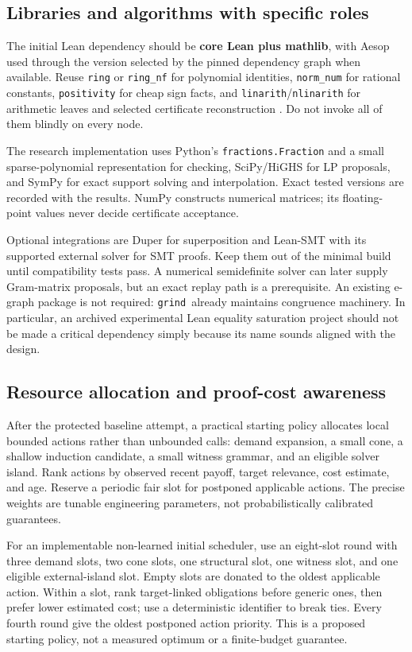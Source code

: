 \documentclass[11pt,a4paper]{article}
\newcommand{\grind}{\texttt{grind}}
\newcommand{\code}[1]{\texttt{\small #1}}
\begin{document}
\subsection{Libraries and algorithms with specific roles}

The initial Lean dependency should be \textbf{core Lean plus mathlib}, with
Aesop used through the version selected by the pinned dependency graph when
available. Reuse \code{ring} or \code{ring\_nf} for polynomial identities,
\code{norm\_num} for rational constants, \code{positivity} for cheap sign facts,
and \code{linarith}/\code{nlinarith} for arithmetic leaves and selected
certificate reconstruction \cite{ring,positivity,linarith}. Do not invoke all
of them blindly on every node.

The research implementation uses Python's \code{fractions.Fraction} and a
small sparse-polynomial representation for checking, SciPy/HiGHS for LP
proposals, and SymPy for exact support solving and interpolation. Exact tested
versions are recorded with the results. NumPy constructs numerical matrices;
its floating-point values never decide certificate acceptance.

Optional integrations are Duper for superposition and Lean-SMT with its
supported external solver for SMT proofs. Keep them out of the minimal build
until compatibility tests pass. A numerical semidefinite solver can later
supply Gram-matrix proposals, but an exact replay path is a prerequisite.
An existing e-graph package is not required: \grind\ already maintains
congruence machinery. In particular, an archived experimental Lean equality
saturation project should not be made a critical dependency simply because
its name sounds aligned with the design.

\subsection{Resource allocation and proof-cost awareness}

After the protected baseline attempt, a practical starting policy allocates
local bounded actions rather than unbounded calls: demand expansion, a small
cone, a shallow induction candidate, a small witness grammar, and an eligible
solver island. Rank actions by observed recent payoff, target relevance, cost
estimate, and age. Reserve a periodic fair slot for postponed applicable
actions. The precise weights are tunable engineering parameters, not
probabilistically calibrated guarantees.

For an implementable non-learned initial scheduler, use an eight-slot round
with three demand slots, two cone slots, one structural slot, one witness slot,
and one eligible external-island slot. Empty slots are donated to the oldest
applicable action. Within a slot, rank target-linked obligations before generic
ones, then prefer lower estimated cost; use a deterministic identifier to break
ties. Every fourth round give the oldest postponed action priority. This is a
proposed starting policy, not a measured optimum or a finite-budget guarantee.
\end{document}
